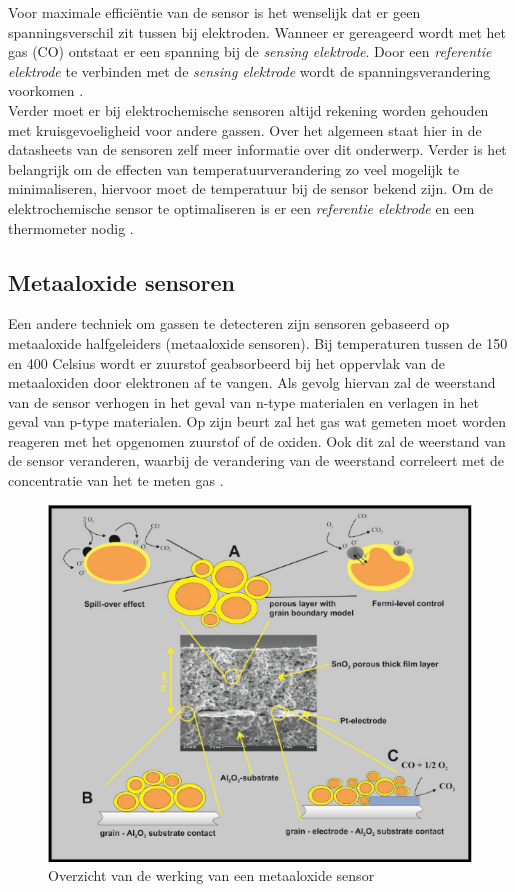 \documentclass[a4paper, 11pt]{article} %
\begin{document}
	\newpage
	Voor maximale efficiëntie van de sensor is het wenselijk dat er geen spanningsverschil zit tussen bij elektroden. Wanneer er gereageerd wordt met het gas (CO) ontstaat er een spanning bij de \textit{sensing elektrode}. Door een \textit{referentie elektrode} te verbinden met de \textit{sensing elektrode} wordt de spanningsverandering voorkomen \cite{SGX Intro}.\\
	Verder moet er bij elektrochemische sensoren altijd rekening worden gehouden met kruisgevoeligheid voor andere gassen. Over het algemeen staat hier in de datasheets van de sensoren zelf meer informatie over dit onderwerp. Verder is het belangrijk om de effecten van temperatuurverandering zo veel mogelijk te minimaliseren, hiervoor moet de temperatuur bij de sensor bekend zijn. Om de elektrochemische sensor te optimaliseren is er een \textit{referentie elektrode} en een thermometer nodig \cite{SGX Intro}.
	
	\subsection{Metaaloxide sensoren} \label{subsec::Metaal_oxide}
	Een andere techniek om gassen te detecteren zijn sensoren gebaseerd op metaaloxide halfgeleiders (metaaloxide sensoren). Bij temperaturen tussen de 150 en 400 \degree Celsius wordt er zuurstof geabsorbeerd bij het oppervlak van de metaaloxiden door elektronen af te vangen. Als gevolg hiervan zal de weerstand van de sensor verhogen in het geval van n-type materialen en verlagen in het geval van p-type materialen. Op zijn beurt zal het gas wat gemeten moet worden reageren met het opgenomen zuurstof of de oxiden. Ook dit zal de weerstand van de sensor veranderen, waarbij de verandering van de weerstand correleert met de concentratie van het te meten gas \cite{MO sensoren}.
	\begin{figure}[h!]
		\centering
		\includegraphics[width=.7\linewidth]{afbeeldingen/MO_sensor.png}
		\caption{Overzicht van de werking van een metaaloxide sensor \cite{MO sensoren}}
		\label{fig:MO_sensor}
	\end{figure}
\end{document}
